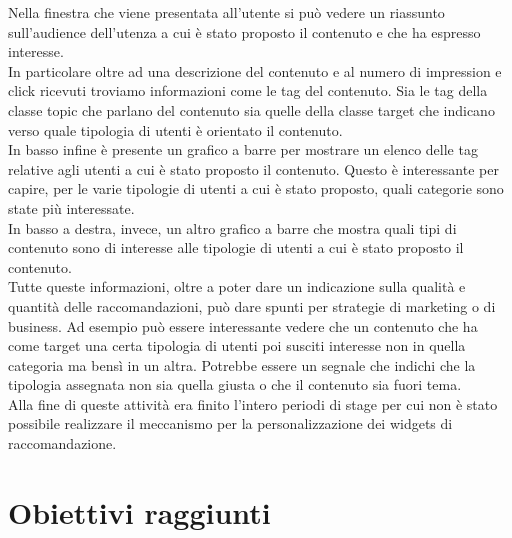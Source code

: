 \documentclass[a4paper, 12pt, twoside, openright]{book}
\begin{document}
Nella finestra che viene presentata all'utente si può vedere un riassunto sull'audience dell'utenza a cui è stato proposto il contenuto e che ha espresso interesse.\\
In particolare oltre ad una descrizione del contenuto e al numero di impression e click ricevuti troviamo informazioni come le tag del contenuto. Sia le tag della classe topic che parlano del contenuto sia quelle della classe target che indicano verso quale tipologia di utenti è orientato il contenuto.\\
In basso infine è presente un grafico a barre per mostrare un elenco delle tag relative agli utenti a cui è stato proposto il contenuto. Questo è interessante per capire, per le varie tipologie di utenti a cui è stato proposto, quali categorie sono state più interessate.\\
In basso a destra, invece, un altro grafico a barre che mostra quali tipi di contenuto sono di interesse alle tipologie di utenti a cui è stato proposto il contenuto.\\

Tutte queste informazioni, oltre a poter dare un indicazione sulla qualità e quantità delle raccomandazioni, può dare spunti per strategie di marketing o di business. Ad esempio può essere interessante vedere che un contenuto che ha come target una certa tipologia di utenti poi susciti interesse non in quella categoria ma bensì in un altra. Potrebbe essere un segnale che indichi che la tipologia assegnata non sia quella giusta o che il contenuto sia fuori tema.\\
Alla fine di queste attività era finito l'intero periodi di stage per cui non è stato possibile realizzare il meccanismo per la personalizzazione dei widgets di raccomandazione.

\section{Obiettivi raggiunti}
\end{document}
